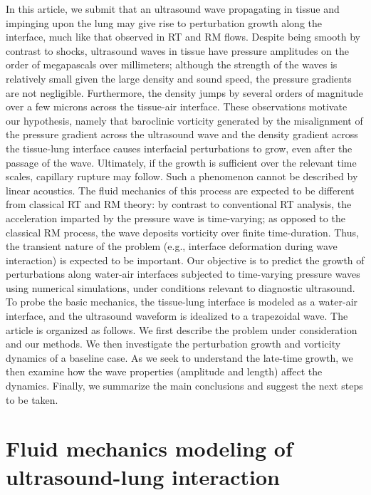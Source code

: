 \documentclass{jfm}%
\begin{document}
In this article, we submit that an ultrasound wave propagating in
tissue and impinging upon the lung may give rise to perturbation
growth along the interface, much like that observed in RT and RM
flows. Despite being smooth by contrast to shocks, ultrasound waves in
tissue have pressure amplitudes on the order of megapascals over
millimeters; although the strength of the waves is relatively small
given the large density and sound speed, the pressure gradients are
not negligible. Furthermore, the density jumps by several orders of
magnitude over a few microns across the tissue-air interface. These
observations motivate our hypothesis, namely that baroclinic vorticity
generated by the misalignment of the pressure gradient across the
ultrasound wave and the density gradient across the tissue-lung
interface causes interfacial perturbations to grow, even after the
passage of the wave. Ultimately, if the growth is sufficient over the
relevant time scales, capillary rupture may follow. Such a phenomenon
cannot be described by linear acoustics. The fluid mechanics of this
process are expected to be different from classical RT and RM theory:
by contrast to conventional RT analysis, the acceleration imparted by
the pressure wave is time-varying; as opposed to the classical RM
process, the wave deposits vorticity over finite time-duration. Thus,
the transient nature of the problem (e.g., interface deformation
during wave interaction) is expected to be important.  Our objective
is to predict the growth of perturbations along water-air interfaces
subjected to time-varying pressure waves using numerical simulations,
under conditions relevant to diagnostic ultrasound. To probe the basic
mechanics, the tissue-lung interface is modeled as a water-air
interface, and the ultrasound waveform is idealized to a trapezoidal
wave. The article is organized as follows. We first describe the
problem under consideration and our methods. We then investigate the
perturbation growth and vorticity dynamics of a baseline case. As we
seek to understand the late-time growth, we then examine how the wave
properties (amplitude and length) affect the dynamics. Finally, we
summarize the main conclusions and suggest the next steps to be taken.

\section{Fluid mechanics modeling of ultrasound-lung interaction}%
\label{sec:methods}%
\end{document}
